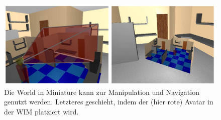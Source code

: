 \begin{figure}[h]
  \centering
  \includegraphics[width=\textwidth]{images/wim1.png}
  \caption{Die World in Miniature  kann zur Manipulation und Navigation genutzt werden. Letzteres geschieht, indem der (hier rote) Avatar in der WIM platziert wird. \cite{Stoakley2010VirtualWIM}}
  \label{fig:todo}
\end{figure}


